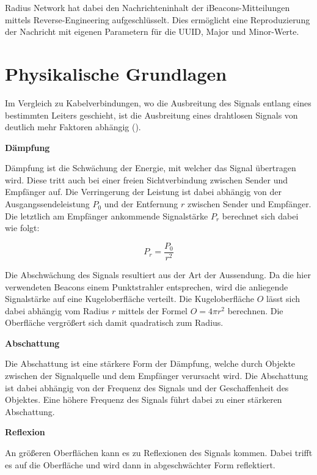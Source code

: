 Radius Network hat dabei den Nachrichteninhalt der iBeacons-Mitteilungen mittels Reverse-Engineering aufgeschlüsselt. Dies ermöglicht eine Reproduzierung der Nachricht mit eigenen Parametern für die UUID, Major und Minor-Werte.

\section{Physikalische Grundlagen}
\label{sec:dataandmeasurement:physics}
Im Vergleich zu Kabelverbindungen, wo die Ausbreitung des Signals entlang eines bestimmten Leiters geschieht, ist die Ausbreitung eines drahtlosen Signals von deutlich mehr Faktoren abhängig (\citet{signalverbreitung}). 

\textbf{Dämpfung}

Dämpfung ist die Schwächung der Energie, mit welcher das Signal übertragen wird. Diese tritt auch bei einer freien Sichtverbindung zwischen Sender und Empfänger auf. Die Verringerung der Leistung ist dabei abhängig von der Ausgangssendeleistung $P_0$ und der Entfernung $r$ zwischen Sender und Empfänger. Die letztlich am Empfänger ankommende Signalstärke $P_r$ berechnet sich dabei wie folgt:

\begin{equation}
	P_r = \frac{P_0}{r^{2}} 
\end{equation}

Die Abschwächung des Signals resultiert aus der Art der Aussendung. Da die hier verwendeten Beacons einem Punktstrahler entsprechen, wird die anliegende Signalstärke auf eine Kugeloberfläche verteilt. Die Kugeloberfläche $O$ lässt sich dabei abhängig vom Radius $r$ mittels der Formel $O = 4 \pi r^{2}$ berechnen. Die Oberfläche vergrößert sich damit quadratisch zum Radius.

\textbf{Abschattung}

Die Abschattung ist eine stärkere Form der Dämpfung, welche durch Objekte zwischen der Signalquelle und dem Empfänger verursacht wird. Die Abschattung ist dabei abhängig von der Frequenz des Signals und der Geschaffenheit des Objektes. Eine höhere Frequenz des Signals führt dabei zu einer stärkeren Abschattung.

\textbf{Reflexion}

An größeren Oberflächen kann es zu Reflexionen des Signals kommen. Dabei trifft es auf die Oberfläche und wird dann in abgeschwächter Form reflektiert.

